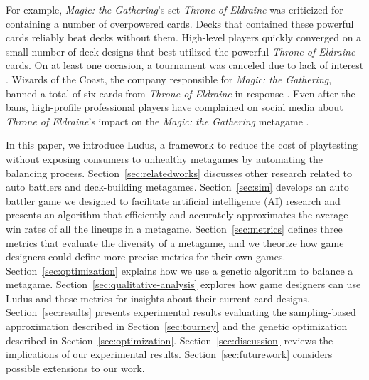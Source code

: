 \documentclass[letterpaper]{article} %
\begin{document}

For example, \textit{Magic: the Gathering}'s set \textit{Throne of
  Eldraine} was criticized for containing a number of overpowered
cards. Decks that contained these powerful cards reliably beat decks
without them. High-level players quickly converged on a small number
of deck designs that best utilized the powerful \textit{Throne
  of Eldraine} cards. On at least one occasion, a tournament was
canceled due to lack of interest \cite{oko-meta-drama}. Wizards of the
Coast, the company responsible for \textit{Magic: the Gathering},
banned a total of six cards from \textit{Throne of Eldraine} in
response \cite{mtg-banlist, mtg-bnr-nov-2019, mtg-bnr-jun-2020,
  mtg-bnr-aug-2020}. Even after the bans, high-profile professional
players have complained on social media about \textit{Throne of
  Eldraine}'s impact on the \textit{Magic: the Gathering} metagame
\cite{lsv-eldraine-complaints}.


In this paper, we introduce {\sc Ludus}, a framework to reduce the cost of playtesting without
exposing consumers to unhealthy metagames by automating the balancing
process.
Section~\ref{sec:relatedworks} discusses other research related to auto battlers and deck-building metagames. 
Section~\ref{sec:sim} %
develops an auto battler game we designed to facilitate artificial intelligence (AI) research %
and presents an algorithm that efficiently
and accurately approximates the average win rates of all the lineups in
a metagame. Section~\ref{sec:metrics} defines three metrics that
evaluate the diversity of a metagame, and %
we theorize how game designers could define
more precise metrics for their own games. Section~\ref{sec:optimization}
explains how we use a genetic algorithm to balance a metagame.
Section~\ref{sec:qualitative-analysis} explores how game designers can use {\sc Ludus} and these
metrics for insights about their current card designs.
Section~\ref{sec:results} presents
experimental results evaluating the sampling-based approximation described
in Section~\ref{sec:tourney} and the genetic optimization described in
Section~\ref{sec:optimization}. Section~\ref{sec:discussion} reviews the
implications of our experimental results. Section~\ref{sec:futurework}
considers possible extensions to our work.
\end{document}
